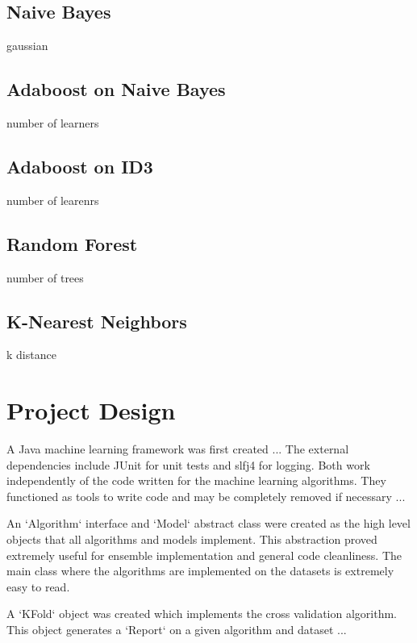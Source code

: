 \documentclass[11pt]{article}
\begin{document}
\subsection{Naive Bayes}
gaussian

\subsection{Adaboost on Naive Bayes}
number of learners

\subsection{Adaboost on ID3}
number of learenrs

\subsection{Random Forest}
number of trees

\subsection{K-Nearest Neighbors}
k
distance

\section{Project Design}
A Java machine learning framework was first created ...
The external dependencies include JUnit for unit tests and slfj4 for logging. Both work independently of the code written for the machine learning algorithms. They functioned as tools to write code and may be completely removed if necessary ...

An `Algorithm` interface and `Model` abstract class were created as the high level objects that all algorithms and models implement. This abstraction proved extremely useful for ensemble implementation and general code cleanliness. The main class where the algorithms are implemented on the datasets is extremely easy to read.

A `KFold` object was created which implements the cross validation algorithm. This object generates a `Report` on a given algorithm and dataset ...
\end{document}
